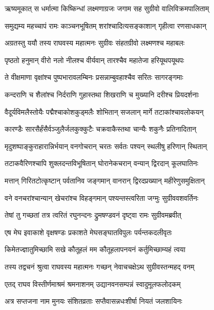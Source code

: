 
\twolineshloka
{ऋष्यमूकात् स धर्मात्मा किष्किन्धां लक्ष्मणाग्रजः}
{जगाम सह सुग्रीवो वालिविक्रमपालिताम्} %

\twolineshloka
{समुद्यम्य महच्चापं रामः काञ्चनभूषितम्}
{शरांश्चादित्यसङ्काशान् गृहीत्वा रणसाधकान्} %

\twolineshloka
{अग्रतस्तु ययौ तस्य राघवस्य महात्मनः}
{सुग्रीवः संहतग्रीवो लक्ष्मणश्च महाबलः} %

\twolineshloka
{पृष्ठतो हनुमान् वीरो नलो नीलश्च वीर्यवान्}
{तारश्चैव महातेजा हरियूथपयूथपः} %

\twolineshloka
{ते वीक्षमाणा वृक्षांश्च पुष्पभारावलम्बिनः}
{प्रसन्नाम्बुवहाश्चैव सरितः सागरङ्गमाः} %

\twolineshloka
{कन्दराणि च शैलांश्च निर्दराणि गुहास्तथा}
{शिखराणि च मुख्यानि दरीश्च प्रियदर्शनाः} %

\twolineshloka
{वैदूर्यविमलैस्तोयैः पद्मैश्चाकोशकुड्मलैः}
{शोभितान् सजलान् मार्गे तटाकांश्चावलोकयन्} %

\twolineshloka
{कारण्डैः सारसैर्हंसैर्वञ्जुलैर्जलकुक्कुटैः}
{चक्रवाकैस्तथा चान्यैः शकुनैः प्रतिनादितान्} %

\twolineshloka
{मृदुशष्पाङ्कुराहारान्निर्भयान् वनगोचरान्}
{चरतः सर्वतः पश्यन् स्थलीषु हरिणान् स्थितान्} %

\twolineshloka
{तटाकवैरिणश्चापि शुक्लदन्तविभूषितान्}
{घोरानेकचरान् वन्यान् द्विरदान् कूलघातिनः} %

\twolineshloka
{मत्तान् गिरितटोत्कृष्टान् पर्वतानिव जङ्गमान्}
{वानरान् द्विरदप्रख्यान् महीरेणुसमुक्षितान्} %

\twolineshloka
{वने वनचरांश्चान्यान् खेचरांश्च विहङ्गमान्}
{पश्यन्तस्त्वरिता जग्मुः सुग्रीववशवर्तिनः} %

\twolineshloka
{तेषां तु गच्छतां तत्र त्वरितं रघुनन्दनः}
{द्रुमषण्डवनं दृष्ट्वा रामः सुग्रीवमब्रवीत्} %

\twolineshloka
{एष मेघ इवाकाशे वृक्षषण्डः प्रकाशते}
{मेघसङ्घातविपुलः पर्यन्तकदलीवृतः} %

\twolineshloka
{किमेतज्ज्ञातुमिच्छामि सखे कौतूहलं मम}
{कौतूहलापनयनं कर्तुमिच्छाम्यहं त्वया} %

\twolineshloka
{तस्य तद्वचनं श्रुत्वा राघवस्य महात्मनः}
{गच्छन् नेवाचचक्षेऽथ सुग्रीवस्तन्महद् वनम्} %

\twolineshloka
{एतद् राघव विस्तीर्णमाश्रमं श्रमनाशनम्}
{उद्यानवनसम्पन्नं स्वादुमूलफलोदकम्} %

\twolineshloka
{अत्र सप्तजना नाम मुनयः संशितव्रताः}
{सप्तैवासन्नधःशीर्षा नियतं जलशायिनः} %

